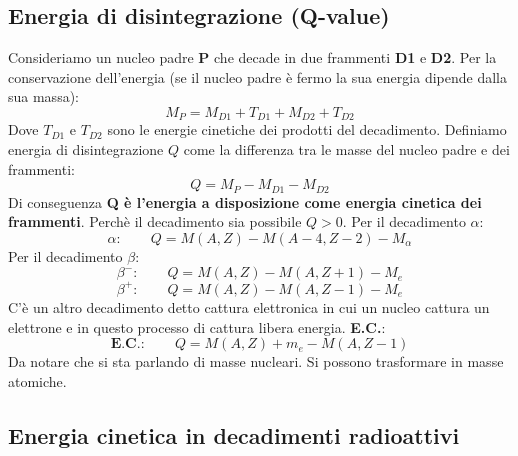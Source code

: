 \subsection{Energia di disintegrazione (Q-value)}
Consideriamo un nucleo padre \textbf{P} che decade in due frammenti \textbf{D1} e \textbf{D2}. Per la conservazione dell'energia (se il nucleo padre è fermo la sua energia dipende dalla sua massa):
\begin{equation*}
    M_P=M_{D1}+T_{D1}+M_{D2}+T_{D2}
\end{equation*}
Dove $T_{D1}$ e $T_{D2}$ sono le energie cinetiche dei prodotti del decadimento. Definiamo energia di disintegrazione $Q$ come la differenza tra le masse del nucleo padre e dei frammenti:
\begin{equation*}
    Q=M_P-M_{D1}-M_{D2}
\end{equation*}
Di conseguenza \textbf{Q è l'energia a disposizione come energia cinetica dei frammenti}. Perchè il decadimento sia possibile $Q>0$. Per il decadimento $\alpha$:
\begin{equation*}
   \alpha: \qquad Q=M(A,Z)-M(A-4,Z-2)-M_\alpha
\end{equation*}
Per il decadimento $\beta$:
\begin{equation*}
    \beta^-: \qquad Q=M(A,Z)-M(A,Z+1)-M_e
\end{equation*}
\begin{equation*}
    \beta^+: \qquad Q=M(A,Z)-M(A,Z-1)-M_e
\end{equation*}
C'è un altro decadimento detto cattura elettronica in cui un nucleo cattura un elettrone e in questo processo di cattura libera energia. \textbf{E.C.}:
\begin{equation*}
    \textbf{E.C.}: \qquad Q=M(A,Z)+m_e-M(A,Z-1)
\end{equation*}
Da notare che si sta parlando di masse nucleari. Si possono trasformare in masse atomiche.
\subsection{Energia cinetica in decadimenti radioattivi}
